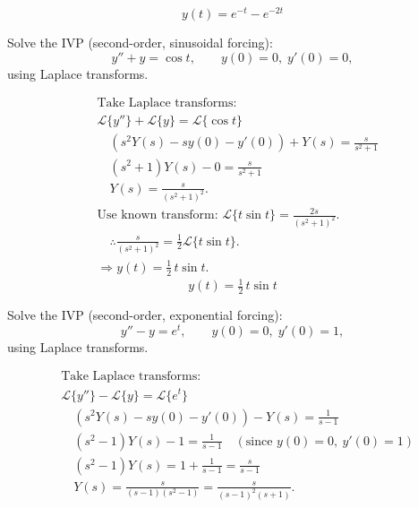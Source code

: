     \[
    \boxed{\,y(t)=e^{-t}-e^{-2t}\,}
    \]

    \bigskip

    \begin{example}
      Solve the IVP (second-order, sinusoidal forcing):
      \[
      y''+y=\cos t,\qquad y(0)=0,\; y'(0)=0,
      \]
      using Laplace transforms.
    \end{example}

  \begin{marginfigure}
    
  \end{marginfigure}

    \begin{align*}
      &\text{Take Laplace transforms:}\\
      &\mathcal{L}\{y''\}+\mathcal{L}\{y\}=\mathcal{L}\{\cos t\} \\
      &\quad (s^2Y(s)-sy(0)-y'(0)) + Y(s) = \frac{s}{s^2+1}\\
      &\quad (s^2+1)Y(s) - 0 = \frac{s}{s^2+1}\\
      &\quad Y(s) = \frac{s}{(s^2+1)^2}.\\[6pt]
      &\text{Use known transform: }\mathcal{L}\{t\sin t\}=\frac{2s}{(s^2+1)^2}.\\
      &\quad \therefore \frac{s}{(s^2+1)^2} = \tfrac12\mathcal{L}\{t\sin t\}.\\[6pt]
      &\Rightarrow y(t)=\tfrac12\,t\sin t.
    \end{align*}
    \[
    \boxed{\,y(t)=\tfrac12\,t\sin t\,}
    \]


    \begin{example}
      Solve the IVP (second-order, exponential forcing):
      \[
      y''-y=e^{t},\qquad y(0)=0,\; y'(0)=1,
      \]
      using Laplace transforms.
    \end{example}

    \begin{align*}
      &\text{Take Laplace transforms:}\\
      &\mathcal{L}\{y''\}-\mathcal{L}\{y\}=\mathcal{L}\{e^{t}\} \\
      &\quad (s^2Y(s)-sy(0)-y'(0)) - Y(s) = \frac{1}{s-1}\\
      &\quad (s^2-1)Y(s) - 1 = \frac{1}{s-1}\quad(\text{since }y(0)=0,\ y'(0)=1)\\
      &\quad (s^2-1)Y(s) = 1 + \frac{1}{s-1} = \frac{s}{s-1}\\
      &\quad Y(s) = \frac{s}{(s-1)(s^2-1)} = \frac{s}{(s-1)^2(s+1)}.
    \end{align*}

